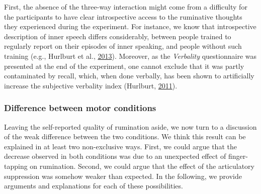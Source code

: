 \documentclass[a4paper,12pt,twoside,openright,oldfontcommands,final]{memoir}
\begin{document}
First, the absence of the three-way interaction might come from a difficulty for the participants to have clear introspective access to the ruminative thoughts they experienced during the experiment. For instance, we know that introspective description of inner speech differs considerably, between people trained to regularly report on their episodes of inner speaking, and people without such training (e.g., Hurlburt et al., \protect\hyperlink{ref-Hurlburt2013}{2013}). Moreover, as the \emph{Verbality} questionnaire was presented at the end of the experiment, one cannot exclude that it was partly contaminated by recall, which, when done verbally, has been shown to artificially increase the subjective verbality index (Hurlburt, \protect\hyperlink{ref-Hurlburt2011}{2011}).

\hypertarget{difference-between-motor-conditions}{%
\subsubsection{Difference between motor conditions}\label{difference-between-motor-conditions}}

Leaving the self-reported quality of rumination aside, we now turn to a discussion of the weak difference between the two conditions. We think this result can be explained in at least two non-exclusive ways. First, we could argue that the decrease observed in both conditions was due to an unexpected effect of finger-tapping on rumination. Second, we could argue that the effect of the articulatory suppression was somehow weaker than expected. In the following, we provide arguments and explanations for each of these possibilities.
\end{document}
